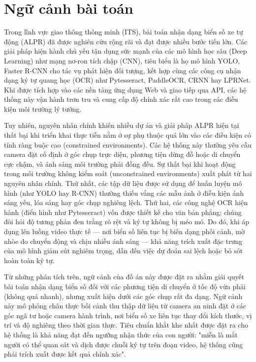 \documentclass[../DoAn.tex]{subfiles}
\begin{document}
\section{Ngữ cảnh bài toán}
\label{section:2.1}
Trong lĩnh vực giao thông thông minh (ITS), bài toán nhận dạng biển số xe tự động (ALPR) đã được nghiên cứu rộng rãi và đạt được nhiều bước tiến lớn. Các giải pháp hiện hành chủ yếu tận dụng sức mạnh của các mô hình học sâu (Deep Learning) như mạng nơ-ron tích chập (CNN), tiêu biểu là họ mô hình YOLO, Faster R-CNN cho tác vụ phát hiện đối tượng, kết hợp cùng các công cụ nhận dạng ký tự quang học (OCR) như Pytesseract, PaddleOCR, CRNN hay LPRNet. Khi được tích hợp vào các nền tảng ứng dụng Web và giao tiếp qua API, các hệ thống này vận hành trơn tru và cung cấp độ chính xác rất cao trong các điều kiện môi trường lý tưởng.

Tuy nhiên, nguyên nhân chính khiến nhiều dự án và giải pháp ALPR hiện tại thất bại khi triển khai thực tiễn nằm ở sự phụ thuộc quá lớn vào các điều kiện có tính ràng buộc cao (constrained environments). Các hệ thống này thường yêu cầu camera đặt cố định ở góc chụp trực diện, phương tiện dừng đỗ hoặc di chuyển cực chậm, và ánh sáng môi trường phải đồng đều. Sự thất bại khi hoạt động trong môi trường không kiểm soát (unconstrained environments) xuất phát từ hai nguyên nhân chính. Thứ nhất, các tập dữ liệu được sử dụng để huấn luyện mô hình (như YOLO hay R-CNN) thường thiếu vắng các mẫu ảnh ở điều kiện ánh sáng yếu, lóa sáng hay góc chụp nghiêng lệch. Thứ hai, các công nghệ OCR hiện hành (điển hình như Pytesseract) vốn được thiết kế cho văn bản phẳng; chúng đòi hỏi độ tương phản đen trắng rõ rệt và ký tự không bị méo mó. Do đó, khi áp dụng lên luồng video thực tế — nơi biển số liên tục bị biến dạng phối cảnh, mờ nhòe do chuyển động và chịu nhiễu ánh sáng — khả năng trích xuất đặc trưng của mô hình giảm sút nghiêm trọng, dẫn đến việc dự đoán sai lệch hoặc bỏ sót hoàn toàn ký tự.

Từ những phân tích trên, ngữ cảnh của đồ án này được đặt ra nhằm giải quyết bài toán nhận dạng biển số đối với các phương tiện di chuyển ở tốc độ vừa phải (không quá nhanh), nhưng xuất hiện dưới các góc chụp rất đa dạng. Ngữ cảnh này mô phỏng chân thực bối cảnh thu thập dữ liệu từ camera an ninh đặt ở các góc ngã tư hoặc camera hành trình, nơi biển số xe liên tục thay đổi kích thước, vị trí và độ nghiêng theo thời gian thực. Tiêu chuẩn khắt khe nhất được đặt ra cho hệ thống là khả năng đạt đến ngưỡng nhận thức của con người: "miễn là mắt người có thể quan sát và dịch được chuỗi ký tự trên đoạn video, hệ thống cũng phải trích xuất được kết quả chính xác".
\end{document}
